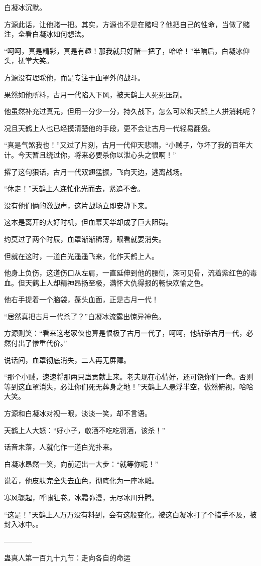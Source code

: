 \begin{this_body}
白凝冰沉默。

方源此话，让他赌一把。其实，方源也不是在赌吗？他把自己的性命，当做了赌注，全看白凝冰如何想法。

“呵呵，真是精彩，真是有趣！那我就只好赌一把了，哈哈！”半晌后，白凝冰仰头，抚掌大笑。

方源没有理睬他，而是专注于血罩外的战斗。

果然如他所料，古月一代陷入下风，被天鹤上人死死压制。

他虽然补充过真元，但用一分少一分，持久战下，怎么可以和天鹤上人拼消耗呢？

况且天鹤上人也已经摸清楚他的手段，更不会让古月一代轻易翻盘。

“真是气煞我也！”又过了片刻，古月一代仰天悲啸，“小贼子，你坏了我的百年大计。今天暂且绕过你，将来必要杀你以泄心头之恨啊！”

撂了这句狠话，古月一代双翅猛振，飞向天边，逃离战场。

“休走！”天鹤上人连忙化光而去，紧追不舍。

没有他们俩的激战声，这片战场立即安静下来。

这本是离开的大好时机，但血幕天华却成了巨大阻碍。

约莫过了两个时辰，血罩渐渐稀薄，眼看就要消失。

但就在这时，一道白光遥遥飞来，化作天鹤上人。

他身上负伤，这道伤口从左肩，一直延伸到他的腰侧，深可见骨，流着紫红色的毒血。但天鹤上人却精神昂扬至极，满怀大仇得报的畅快欢愉之色。

他右手提着一个脑袋，蓬头血面，正是古月一代！

“居然真把古月一代杀了？”白凝冰流露出惊异神色。

方源则笑：“看来这老家伙也算是恨极了古月一代了，呵呵，他斩杀古月一代，必然付出了惨重代价。”

说话间，血罩彻底消失，二人再无屏障。

“那个小贼，速速将那两只蛊贡献上来。老夫现在心情好，还可饶你们一命。否则等到这血罩消失，必让你们死无葬身之地！”天鹤上人悬浮半空，傲然俯视，哈哈大笑。

方源和白凝冰对视一眼，淡淡一笑，却不言语。

天鹤上人大怒：“好小子，敬酒不吃吃罚酒，该杀！”

话音未落，人就化作一道白光扑来。

白凝冰昂然一笑，向前迈出一大步：“就等你呢！”

说着，他皮肤完全失去血色，彻底化为一座冰雕。

寒风骤起，呼啸狂卷。冰霜弥漫，无尽冰川升腾。

“这是！”天鹤上人万万没有料到，会有这般变化。被这白凝冰打了个措手不及，被封入冰中。。

------------

蛊真人第一百九十九节：走向各自的命运

\end{this_body}

